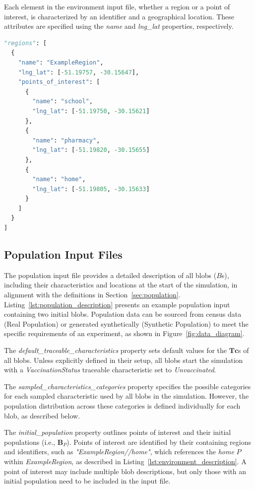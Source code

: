 \documentclass[pdflatex,sn-mathphys-num]{sn-jnl}%
\theoremstyle{thmstyleone}%
\theoremstyle{thmstyletwo}%
\theoremstyle{thmstylethree}%
\begin{document}
\begin{appendices}
{Each element in the environment input file, whether a region or a point of interest, is characterized by an identifier and a geographical location. These attributes are specified using the \textit{name} and \textit{lng\_lat} properties, respectively.}

\begin{lstlisting}[language={python},
caption={Example of an environment input file.},
captionpos=b, label={lst:environment_description}, basicstyle=\footnotesize]
"regions": [ 
  {
    "name": "ExampleRegion",
    "lng_lat": [-51.19757, -30.15647],
    "points_of_interest": [
      { 
        "name": "school",
        "lng_lat": [-51.19750, -30.15621]
      },
      { 
        "name": "pharmacy",
        "lng_lat": [-51.19820, -30.15655]
      },
      { 
        "name": "home",
        "lng_lat": [-51.19805, -30.15633]
      }
    ]
  } 
]
\end{lstlisting}

\subsection{Population Input Files}
\label{app:input_population}

The population input file provides a detailed description of all blobs ($B$s), including their characteristics and locations at the start of the simulation, in alignment with the definitions in Section~\ref{sec:population}. Listing~\ref{lst:population_description} presents an example population input containing two initial blobs. Population data can be sourced from census data (Real Population) or generated synthetically (Synthetic Population) to meet the specific requirements of an experiment, as shown in Figure~\ref{fig:data_diagram}.

The \textit{default\_traceable\_characteristics} property sets default values for the $\bm{Tc}$s of all blobs. Unless explicitly defined in their setup, all blobs start the simulation with a \textit{VaccinationStatus} traceable characteristic set to \textit{Unvaccinated}.

The \textit{sampled\_characteristics\_categories} property specifies the possible categories for each sampled characteristic used by all blobs in the simulation. However, the population distribution across these categories is defined individually for each blob, as described below.

The \textit{initial\_population} property outlines points of interest and their initial populations (i.e., $\bm{B}_{P}$). Points of interest are identified by their containing regions and identifiers, such as \textit{"ExampleRegion//home"}, which references the \textit{home} $P$ within \textit{ExampleRegion}, as described in Listing~\ref{lst:environment_description}. A point of interest may include multiple blob descriptions, but only those with an initial population need to be included in the input file.


\end{appendices}
\end{document}
